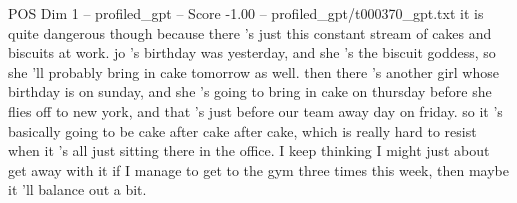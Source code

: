 \begin{textsample}{POS Dim 1 – profiled\_gpt – Score -1.00 – profiled\_gpt/t000370\_gpt.txt}  \label{ex:f1_pos_034}
it is quite dangerous though because there ’s just this constant stream of cakes and biscuits at work. jo ’s birthday was yesterday, and she ’s the biscuit goddess, so she ’ll probably bring in cake tomorrow as well. then there ’s another girl whose birthday is on sunday, and she ’s going to bring in cake on thursday before she flies off to new york, and that ’s just before our team away day on friday. so it ’s basically going to be cake after cake after cake, which is really hard to resist when it ’s all just sitting there in the office.
I keep thinking I might just about get away with it if I manage to get to the gym three times this week, then maybe it ’ll balance out a bit.

\end{textsample}
